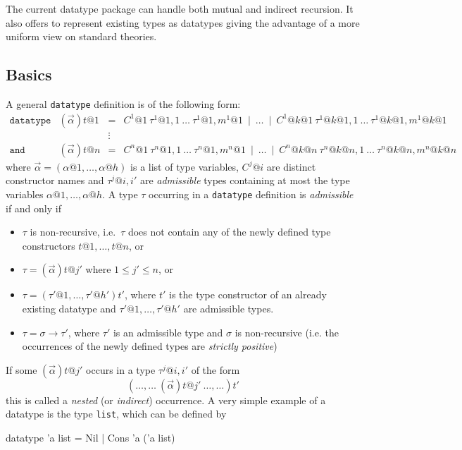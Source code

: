 The current datatype package can handle both mutual and indirect recursion.
It also offers to represent existing types as datatypes giving the advantage
of a more uniform view on standard theories.


\subsection{Basics}
\label{subsec:datatype:basics}

A general \texttt{datatype} definition is of the following form:
\[
\begin{array}{llcl}
\mathtt{datatype} & (\vec{\alpha})t@1 & = &
  C^1@1~\tau^1@{1,1}~\ldots~\tau^1@{1,m^1@1} ~\mid~ \ldots ~\mid~
    C^1@{k@1}~\tau^1@{k@1,1}~\ldots~\tau^1@{k@1,m^1@{k@1}} \\
 & & \vdots \\
\mathtt{and} & (\vec{\alpha})t@n & = &
  C^n@1~\tau^n@{1,1}~\ldots~\tau^n@{1,m^n@1} ~\mid~ \ldots ~\mid~
    C^n@{k@n}~\tau^n@{k@n,1}~\ldots~\tau^n@{k@n,m^n@{k@n}}
\end{array}
\]
where $\vec{\alpha} = (\alpha@1,\ldots,\alpha@h)$ is a list of type variables,
$C^j@i$ are distinct constructor names and $\tau^j@{i,i'}$ are {\em
  admissible} types containing at most the type variables $\alpha@1, \ldots,
\alpha@h$. A type $\tau$ occurring in a \texttt{datatype} definition is {\em
  admissible} if and only if
\begin{itemize}
\item $\tau$ is non-recursive, i.e.\ $\tau$ does not contain any of the
newly defined type constructors $t@1,\ldots,t@n$, or
\item $\tau = (\vec{\alpha})t@{j'}$ where $1 \leq j' \leq n$, or
\item $\tau = (\tau'@1,\ldots,\tau'@{h'})t'$, where $t'$ is
the type constructor of an already existing datatype and $\tau'@1,\ldots,\tau'@{h'}$
are admissible types.
\item $\tau = \sigma \to \tau'$, where $\tau'$ is an admissible
type and $\sigma$ is non-recursive (i.e. the occurrences of the newly defined
types are {\em strictly positive})
\end{itemize}
If some $(\vec{\alpha})t@{j'}$ occurs in a type $\tau^j@{i,i'}$
of the form
\[
(\ldots,\ldots ~ (\vec{\alpha})t@{j'} ~ \ldots,\ldots)t'
\]
this is called a {\em nested} (or \emph{indirect}) occurrence. A very simple
example of a datatype is the type \texttt{list}, which can be defined by
\begin{ttbox}
datatype 'a list = Nil
                 | Cons 'a ('a list)
\end{ttbox}
